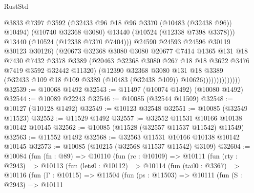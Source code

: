 \begin{lexlean}{RustStd}
\begin{coremodule}
                                @3833
                                @7397
                                @3592
                                (@32433 @96 @18 @96 @3370 (@10483 (@32438 @96)) @10494)
                                (@10740 @32368 @3080)
                                @13440
                                (@10524 (@12338 @7398 @3378)))
                              @13440
                              (@10524 (@12338 @7370 @7404)))
                            @24590
                            @24593
                            @24596
                            @30119
                            @30123
                            @30126)
                          (@20673
                            @32368
                            @3080
                            @3080
                            @20677
                            @7414
                            @1365
                            @131
                            @18
                            @7430
                            @7432
                            @3378
                            @3389
                            (@20463 @32368 @3080 @267 @18 @18 @3622 @3476 @7419 @3592 @32442 @11320)
                            (@12390
                              @32368
                              @3080
                              @131
                              @18
                              @3389
                              (@32433
                                @109
                                @18
                                @109
                                @3389
                                (@10483 (@32438 @109))
                                @10626))))))))))))))
@32539 := @10068 @1492
@32543 := @11497 (@10074 @1492) (@10080 @1492)
@32544 := @10089 @22243
@32546 := @10085 (@32544 @11509)
@32548 := @10127 (@10128 @1492)
@32549 := @10123 @32548
@32551 := @10085 (@32549 @11523)
@32552 := @11529 @1492
@32557 := @32552 @11531 @10166 @10138 @10142 @10145
@32562 := @10085 (@11528 (@32557 @11537 @11542) @11549)
@32563 := @11552 @1492
@32568 := @32563 @11531 @10166 @10138 @10142 @10145
@32573 := @10085 (@10215 (@32568 @11537 @11542) @3109)
@32604 := @10084
    (fun (fn : @89) =>
    @10110
      (fun (rc : @10109) =>
      @10111
        (fun (rty : @2943) =>
        @10113
          (fun (lets0 : @10112) =>
          @10114
            (fun (tail0 : @3367) =>
            @10116
              (fun (Γ : @10115) =>
              @11504
                (fun (ps : @11503) =>
                @10111
                  (fun (S : @2943) =>
                  @10111

\end{coremodule}
\end{lexlean}
